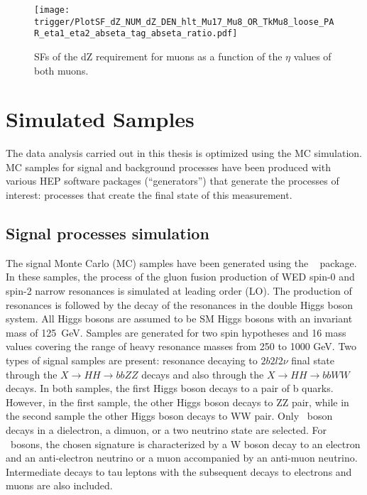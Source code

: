 \begin{figure}[H]
\centering
\texttt{[image: trigger/PlotSF\_dZ\_NUM\_dZ\_DEN\_hlt\_Mu17\_Mu8\_OR\_TkMu8\_loose\_PAR\_eta1\_eta2\_abseta\_tag\_abseta\_ratio.pdf]}
\caption[SFs of the dZ requirement for muons.]{SFs of the dZ requirement for muons as a function of the $\eta$ values of both muons.}
\label{fig:trigger_SF_dimu_dZ_H}
\end{figure}

\section{Simulated Samples}
\label{sec:simulated_samples}

The data analysis carried out in this thesis is optimized using the MC simulation. MC samples for signal and background processes have been produced with various HEP software packages (``generators'') that generate the processes of interest: processes that create the final state of this measurement. 

\subsection{Signal processes simulation\label{sec:signalMC}}

The signal Monte Carlo (MC) samples have been generated using the {\MGMCatNLO} ~\cite{Alwall:2014hca} package. In these samples, the process of the gluon fusion production of WED spin-0 and spin-2 narrow resonances is simulated at leading order (LO). The production of resonances is followed by the decay of the resonances in the double Higgs boson system. All Higgs bosons are assumed to be SM Higgs bosons with an invariant mass of 125~GeV. Samples are generated for two spin hypotheses and 16 mass values covering the range of heavy resonance masses from 250 to 1000 GeV. Two types of signal samples are present: resonance decaying to $2b 2l 2\nu$ final state through the $X \rightarrow HH \rightarrow bbZZ$ decays and also through the $X \rightarrow HH \rightarrow bbWW$ decays. In both samples, the first Higgs boson decays to a pair of b quarks. However, in the first sample, the other Higgs boson decays to ZZ pair, while in the second sample the other Higgs boson decays to WW pair. Only \PZ~boson decays in a dielectron, a dimuon, or a two neutrino state are selected. For \PW ~bosons, the chosen signature is characterized by a W boson decay to an electron and an anti-electron neutrino or a muon accompanied by an anti-muon neutrino. Intermediate decays to tau leptons with the subsequent decays to electrons and muons are also included. 

